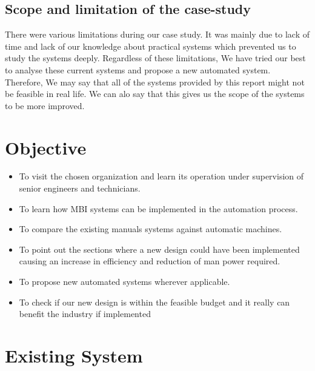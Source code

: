 \documentclass[12pt]{article}
\begin{document}
\subsection{ Scope and limitation of the case-study}
There were various limitations during our case study.
 It was mainly due to lack of time and lack of our knowledge about practical systems which prevented us to study the systems deeply.
Regardless of these limitations, We have tried our best to analyse these current systems and propose a new automated system.
Therefore, We may say that all of the systems provided by this report might not be feasible in real life. 
We can alo say that this gives us the scope of the systems to be more improved.

\newpage

\section{Objective}
\begin{itemize}
\item To visit the chosen organization and learn its operation under supervision of senior engineers and technicians. 
\item To learn how MBI systems can be implemented in the automation process.
\item To compare the existing manuals systems against automatic machines.
\item To point out the sections where a new design could have been implemented causing an increase in efficiency and reduction of man power required. 
\item To propose new automated systems wherever applicable.
\item To check if our new design is within the feasible budget and it really can benefit the industry if implemented
\end{itemize}
\newpage
\section{Existing System}
\end{document}
